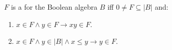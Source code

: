 $F$ is a  for the Boolean algebra $B$ iff $0 \neq F \subseteq |B|$ and:
\begin{enumerate}
\item $x \in F \land y \in F \rightarrow xy \in F$.
\item $x \in F \land y \in |B| \land x \leq y \rightarrow y \in F$.
\end{enumerate}
